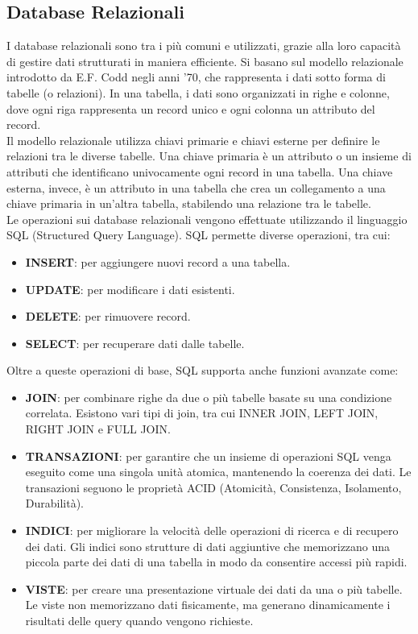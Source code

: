 \documentclass{article}
\begin{document}
\subsection{Database Relazionali}
I database relazionali sono tra i più comuni e utilizzati, grazie alla loro capacità di gestire dati strutturati in maniera efficiente. Si basano sul modello relazionale introdotto da E.F. Codd negli anni '70, che rappresenta i dati sotto forma di tabelle (o relazioni). In una tabella, i dati sono organizzati in righe e colonne, dove ogni riga rappresenta un record unico e ogni colonna un attributo del record.\\
Il modello relazionale utilizza chiavi primarie e chiavi esterne per definire le relazioni tra le diverse tabelle. Una chiave primaria è un attributo o un insieme di attributi che identificano univocamente ogni record in una tabella. Una chiave esterna, invece, è un attributo in una tabella che crea un collegamento a una chiave primaria in un'altra tabella, stabilendo una relazione tra le tabelle.\\
Le operazioni sui database relazionali vengono effettuate utilizzando il linguaggio SQL (Structured Query Language). SQL permette diverse operazioni, tra cui:
\begin{itemize}
    \item \textbf{INSERT}: per aggiungere nuovi record a una tabella.
    \item \textbf{UPDATE}: per modificare i dati esistenti.
    \item \textbf{DELETE}: per rimuovere record.
    \item \textbf{SELECT}: per recuperare dati dalle tabelle.
\end{itemize}
Oltre a queste operazioni di base, SQL supporta anche funzioni avanzate come:
\begin{itemize}
    \item \textbf{JOIN}: per combinare righe da due o più tabelle basate su una condizione correlata. Esistono vari tipi di join, tra cui INNER JOIN, LEFT JOIN, RIGHT JOIN e FULL JOIN.
    \item \textbf{TRANSAZIONI}: per garantire che un insieme di operazioni SQL venga eseguito come una singola unità atomica, mantenendo la coerenza dei dati. Le transazioni seguono le proprietà ACID (Atomicità, Consistenza, Isolamento, Durabilità).
    \item \textbf{INDICI}: per migliorare la velocità delle operazioni di ricerca e di recupero dei dati. Gli indici sono strutture di dati aggiuntive che memorizzano una piccola parte dei dati di una tabella in modo da consentire accessi più rapidi.
    \item \textbf{VISTE}: per creare una presentazione virtuale dei dati da una o più tabelle. Le viste non memorizzano dati fisicamente, ma generano dinamicamente i risultati delle query quando vengono richieste.
\end{itemize}
\end{document}
